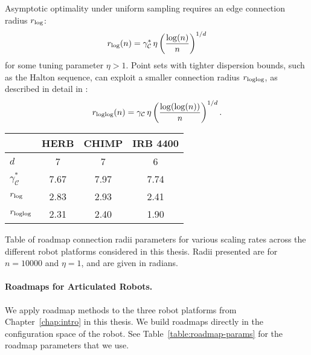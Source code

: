 Asymptotic optimality under uniform sampling requires
an edge connection radius $r_{\mbox{\scriptsize log}}$:
\begin{equation}
   r_{\mbox{\scriptsize log}}(n) =  \gamma^*_{\mathcal{C}} \, \eta
      \left( \frac{\log(n)}{n} \right)^{1/d}
\end{equation}
for some tuning parameter $\eta > 1$.
Point sets with tighter dispersion bounds,
such as the Halton sequence,
can exploit a smaller connection radius $r_{\mbox{\scriptsize loglog}}$,
as described in detail in \citep{janson2015deterministicsampling}:
\begin{equation}
   r_{\mbox{\scriptsize loglog}}(n) = \gamma_{\mathcal{C}} \, \eta
      \left( \frac{\log(\log(n))}{n} \right)^{1/d}.
\end{equation}

\begin{margintable}
   \centering
   {\renewcommand{\tabcolsep}{0.15cm}
   \begin{tabular}{lccc}
      \toprule
      & HERB & CHIMP & IRB 4400 \\
      \midrule
      $d$ & 7 & 7 & 6 \\
      $\gamma^*_{\mathcal{C}}$ & 7.67 & 7.97 & 7.74 \\
      $r_{\mbox{\scriptsize log}}$ & 2.83 & 2.93 & 2.41 \\
      $r_{\mbox{\scriptsize loglog}}$ & 2.31 & 2.40 & 1.90 \\
      \bottomrule
   \end{tabular}
   }
   \vspace{0.1cm}
   \caption{Table of roadmap connection radii parameters for
      various scaling rates across the different robot platforms
      considered in this thesis.
      Radii presented are for $n=10000$ and $\eta = 1$,
      and are given in radians.}
   \label{table:roadmap-params}
\end{margintable}

\paragraph{Roadmaps for Articulated Robots.}
We apply roadmap methods to the three robot platforms
from Chapter~\ref{chap:intro} in this thesis.
We build roadmaps directly in the configuration space of the robot.
See Table~\ref{table:roadmap-params} for the roadmap parameters
that we use.


